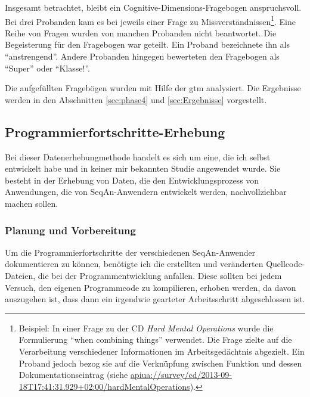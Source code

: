 \label{sec:cdf-usage-difficulties}
Insgesamt betrachtet, bleibt ein Cognitive-Dimensions-Fragebogen anspruchsvoll. Bei drei Probanden kam es bei jeweils einer Frage zu Missverständnissen\footnote{Beispiel: In einer Frage zu der CD \textit{Hard Mental Operations} wurde die Formulierung ``when combining things'' verwendet. Die Frage zielte auf die Verarbeitung verschiedener Informationen im Arbeitsgedächtnis abgezielt. Ein Proband jedoch bezog sie auf die Verknüpfung zwischen Funktion und dessen Dokumentationseintrag (siehe \url{apiua://survey/cd/2013-09-18T17:41:31.929+02:00/hardMentalOperations}).}. Eine Reihe von Fragen wurden von manchen Probanden nicht beantwortet. Die Begeisterung für den Fragebogen war geteilt. Ein Proband bezeichnete ihn als ``anstrengend''. Andere Probanden hingegen bewerteten den Fragebogen als ``Super'' oder ``Klasse!''.

Die aufgefüllten Fragebögen wurden mit Hilfe der \gls{gtm} analysiert. Die Ergebnisse werden in den Abschnitten \ref{sec:phase4} und \ref{sec:Ergebnisse} vorgestellt.




\subsection{Programmierfortschritte-Erhebung}
\label{sec:programmierfortschritte}

Bei dieser Datenerhebungmethode handelt es sich um eine, die ich selbst entwickelt habe und in keiner mir bekannten Studie angewendet wurde. Sie besteht in der Erhebung von Daten, die den Entwicklungsprozess von Anwendungen, die von SeqAn-Anwendern entwickelt werden, nachvollziehbar machen sollen.


\subsubsection{Planung und Vorbereitung}

Um die Programmierfortschritte der verschiedenen SeqAn-Anwender dokumentieren zu können, benötigte ich die erstellten und veränderten Quellcode-Dateien, die bei der Programmentwicklung anfallen. Diese sollten bei jedem Versuch, den eigenen Programmcode zu kompilieren, erhoben werden, da davon auszugehen ist, dass dann ein irgendwie gearteter Arbeitsschritt abgeschlossen ist.

